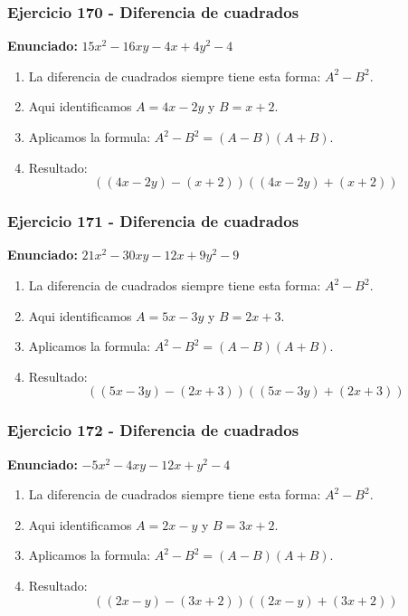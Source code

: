 \documentclass[11pt,a4paper]{article}
\begin{document}
\vspace{0.2cm}
\subsubsection*{Ejercicio 170 - Diferencia de cuadrados}
\textbf{Enunciado:} $ 15 x^{2} - 16 x y - 4 x + 4 y^{2} - 4 $\par
\begin{enumerate}[leftmargin=2em]
\item La diferencia de cuadrados siempre tiene esta forma: \(A^2-B^2\).
\item Aqui identificamos \(A=4 x - 2 y\) y \(B=x + 2\).
\item Aplicamos la formula: \(A^2-B^2=(A-B)(A+B)\).
\item Resultado: \[\boxed{\left(\left(4 x - 2 y\right)-\left(x + 2\right)\right)\left(\left(4 x - 2 y\right)+\left(x + 2\right)\right)}\]
\end{enumerate}

\vspace{0.2cm}
\subsubsection*{Ejercicio 171 - Diferencia de cuadrados}
\textbf{Enunciado:} $ 21 x^{2} - 30 x y - 12 x + 9 y^{2} - 9 $\par
\begin{enumerate}[leftmargin=2em]
\item La diferencia de cuadrados siempre tiene esta forma: \(A^2-B^2\).
\item Aqui identificamos \(A=5 x - 3 y\) y \(B=2 x + 3\).
\item Aplicamos la formula: \(A^2-B^2=(A-B)(A+B)\).
\item Resultado: \[\boxed{\left(\left(5 x - 3 y\right)-\left(2 x + 3\right)\right)\left(\left(5 x - 3 y\right)+\left(2 x + 3\right)\right)}\]
\end{enumerate}

\vspace{0.2cm}
\subsubsection*{Ejercicio 172 - Diferencia de cuadrados}
\textbf{Enunciado:} $ - 5 x^{2} - 4 x y - 12 x + y^{2} - 4 $\par
\begin{enumerate}[leftmargin=2em]
\item La diferencia de cuadrados siempre tiene esta forma: \(A^2-B^2\).
\item Aqui identificamos \(A=2 x - y\) y \(B=3 x + 2\).
\item Aplicamos la formula: \(A^2-B^2=(A-B)(A+B)\).
\item Resultado: \[\boxed{\left(\left(2 x - y\right)-\left(3 x + 2\right)\right)\left(\left(2 x - y\right)+\left(3 x + 2\right)\right)}\]
\end{enumerate}
\end{document}
